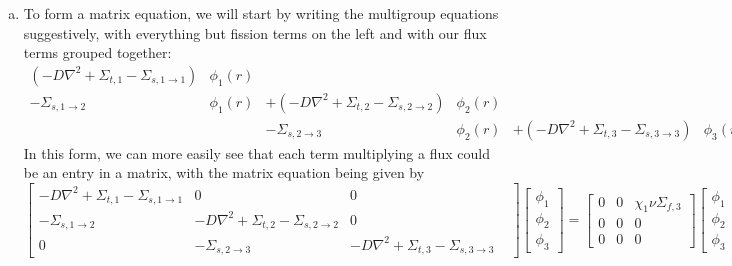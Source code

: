 \documentclass{report}
\begin{document}
\begin{enumerate}[a)]
\item

To form a matrix equation, we will start by writing the multigroup equations suggestively, with everything but fission terms on the left and with our flux terms grouped together:
\begin{align*}
\left(-D \nabla^2 + \Sigma_{t,1} - \Sigma_{s,1 \rightarrow 1}\right)&\phi_1(r) && && &&= \chi_1 \nu \Sigma_{f,3}\phi_{3}(r) \\
-\Sigma_{s,1 \rightarrow 2}&\phi_1(r) &+ \left(-D \nabla^2 + \Sigma_{t,2} - \Sigma_{s,2 \rightarrow 2}\right)&\phi_2(r) && &&= 0 \\
&&- \Sigma_{s,2 \rightarrow 3}&\phi_{2}(r) &+ \left(-D \nabla^2 + \Sigma_{t,3} - \Sigma_{s,3 \rightarrow 3}\right)&\phi_{3}(r) &&= 0 
\end{align*}
In this form, we can more easily see that each term multiplying a flux could be an entry in a 
matrix, with the matrix equation being given by
$$\begin{bmatrix}
-D \nabla^2 + \Sigma_{t,1} - \Sigma_{s,1 \rightarrow 1} & 0 & 0 \\
-\Sigma_{s,1 \rightarrow 2} & -D \nabla^2 + \Sigma_{t,2} - \Sigma_{s,2 \rightarrow 2} & 0 & \\
0 & - \Sigma_{s,2 \rightarrow 3} & -D \nabla^2 + \Sigma_{t,3} - \Sigma_{s,3 \rightarrow 3}
\end{bmatrix}\begin{bmatrix}
\phi_1 \\
\phi_2 \\
\phi_3
\end{bmatrix} = \begin{bmatrix}
0 & 0 & \chi_1 \nu \Sigma_{f,3} \\
0 & 0 & 0 \\
0 & 0 & 0
\end{bmatrix}\begin{bmatrix}
\phi_1 \\
\phi_2 \\
\phi_3
\end{bmatrix}$$
\end{enumerate}
\end{document}
